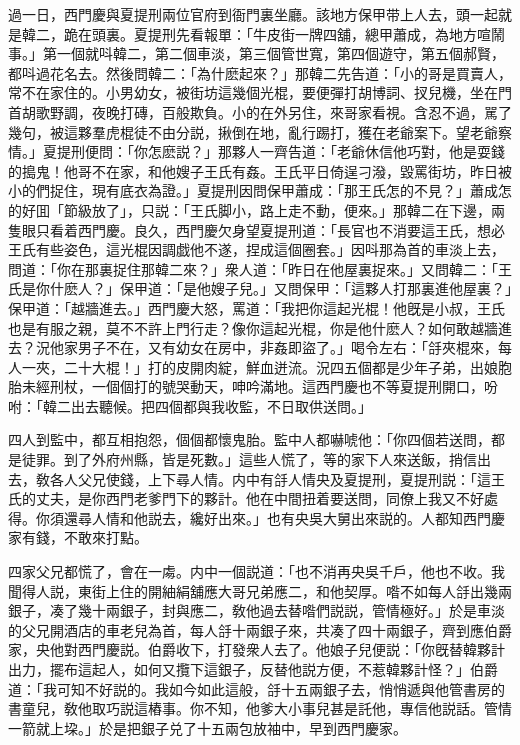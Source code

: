 過一日，西門慶與夏提刑兩位官府到衙門裏坐廳。該地方保甲带上人去，頭一起就是韓二，跪在頭裏。夏提刑先看報單：「牛皮街一牌四舖，總甲蕭成，為地方喧鬧事。」第一個就呌韓二，第二個車淡，第三個管世寬，第四個遊守，第五個郝賢，都呌過花名去。然後問韓二：「為什麽起來？」那韓二先告道：「小的哥是買賣人，常不在家住的。小男幼女，被街坊這幾個光棍，要便彈打胡博詞、扠兒機，坐在門首胡歌野調，夜晚打磚，百般欺負。小的在外另住，來哥家看視。含忍不過，駡了幾句，被這夥羣虎棍徒不由分説，揪倒在地，亂行踢打，獲在老爺案下。望老爺察情。」夏提刑便問：「你怎麽説？」那夥人一齊告道：「老爺休信他巧對，他是耍錢的搗鬼！他哥不在家，和他嫂子王氏有姦。王氏平日倚逞刁潑，毀罵街坊，昨日被小的們捉住，現有底衣為證。」夏提刑因問保甲蕭成：「那王氏怎的不見？」蕭成怎的好囬「節級放了」，只説：「王氏脚小，路上走不動，便來。」那韓二在下邊，兩隻眼只看着西門慶。良久，西門慶欠身望夏提刑道：「長官也不消要這王氏，想必王氏有些姿色，這光棍因調戯他不遂，捏成這個圈套。」因呌那為首的車淡上去，問道：「你在那裏捉住那韓二來？」衆人道：「昨日在他屋裏捉來。」又問韓二：「王氏是你什麽人？」保甲道：「是他嫂子兒。」又問保甲：「這夥人打那裏進他屋裏？」保甲道：「越牆進去。」西門慶大怒，罵道：「我把你這起光棍！他旣是小叔，王氏也是有服之親，莫不不許上門行走？像你這起光棍，你是他什麽人？如何敢越牆進去？況他家男子不在，又有幼女在房中，非姦即盜了。」喝令左右：「㧱夾棍來，每人一夾，二十大棍！」打的皮開肉綻，鮮血迸流。況四五個都是少年子弟，出娘胞胎未經刑杖，一個個打的號哭動天，呻吟滿地。這西門慶也不等夏提刑開口，吩咐：「韓二出去聽候。把四個都與我收監，不日取供送問。」

四人到監中，都互相抱怨，個個都懷鬼胎。監中人都嚇唬他：「你四個若送問，都是徒罪。到了外府州縣，皆是死數。」這些人慌了，等的家下人來送飯，捎信出去，敎各人父兄使錢，上下尋人情。内中有㧱人情央及夏提刑，夏提刑説：「這王氏的丈夫，是你西門老爹門下的夥計。他在中間扭着要送問，同僚上我又不好處得。你須還尋人情和他説去，纔好出來。」也有央吳大舅出來説的。人都知西門慶家有錢，不敢來打點。

四家父兄都慌了，會在一䖏。内中一個説道：「也不消再央吳千戶，他也不收。我聞得人説，東街上住的開紬絹舖應大哥兄弟應二，和他契厚。喒不如每人㧱出幾兩銀子，凑了幾十兩銀子，封與應二，敎他過去替喒們説説，管情極好。」於是車淡的父兄開酒店的車老兒為首，每人㧱十兩銀子來，共凑了四十兩銀子，齊到應伯爵家，央他對西門慶説。伯爵收下，打發衆人去了。他娘子兒便説：「你旣替韓夥計出力，擺布這起人，如何又攬下這銀子，反替他説方便，不惹韓夥計怪？」伯爵道：「我可知不好説的。我如今如此這般，㧱十五兩銀子去，悄悄遞與他管書房的書童兒，敎他取巧説這樁事。你不知，他爹大小事兒甚是託他，專信他説話。管情一箭就上垜。」於是把銀子兑了十五兩包放袖中，早到西門慶家。

